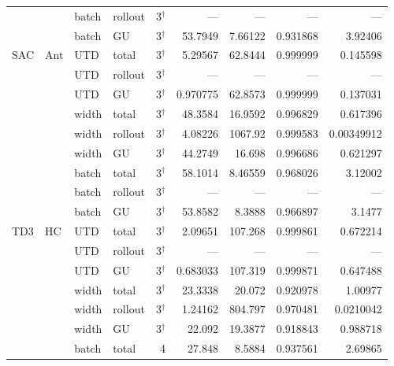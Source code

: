 {\begin{longtable}{@{}llllrrrrr@{}}
     &  & batch & rollout & \num{3}$^{\dagger}$ & --- & --- & --- & --- \\
     &  & batch & GU & \num{3}$^{\dagger}$ & \num{53.7949} & \num{7.66122} & \num{0.931868} & \num{3.92406} \\
    SAC & Ant & UTD & total & \num{3}$^{\dagger}$ & \num{5.29567} & \num{62.8444} & \num{0.999999} & \num{0.145598} \\
     &  & UTD & rollout & \num{3}$^{\dagger}$ & --- & --- & --- & --- \\
     &  & UTD & GU & \num{3}$^{\dagger}$ & \num{0.970775} & \num{62.8573} & \num{0.999999} & \num{0.137031} \\
     &  & width & total & \num{3}$^{\dagger}$ & \num{48.3584} & \num{16.9592} & \num{0.996829} & \num{0.617396} \\
     &  & width & rollout & \num{3}$^{\dagger}$ & \num{4.08226} & \num{1067.92} & \num{0.999583} & \num{0.00349912} \\
     &  & width & GU & \num{3}$^{\dagger}$ & \num{44.2749} & \num{16.698} & \num{0.996686} & \num{0.621297} \\
     &  & batch & total & \num{3}$^{\dagger}$ & \num{58.1014} & \num{8.46559} & \num{0.968026} & \num{3.12002} \\
     &  & batch & rollout & \num{3}$^{\dagger}$ & --- & --- & --- & --- \\
     &  & batch & GU & \num{3}$^{\dagger}$ & \num{53.8582} & \num{8.3888} & \num{0.966897} & \num{3.1477} \\
    \midrule
    TD3 & HC & UTD & total & \num{3}$^{\dagger}$ & \num{2.09651} & \num{107.268} & \num{0.999861} & \num{0.672214} \\
     &  & UTD & rollout & \num{3}$^{\dagger}$ & --- & --- & --- & --- \\
     &  & UTD & GU & \num{3}$^{\dagger}$ & \num{0.683033} & \num{107.319} & \num{0.999871} & \num{0.647488} \\
     &  & width & total & \num{3}$^{\dagger}$ & \num{23.3338} & \num{20.072} & \num{0.920978} & \num{1.00977} \\
     &  & width & rollout & \num{3}$^{\dagger}$ & \num{1.24162} & \num{804.797} & \num{0.970481} & \num{0.0210042} \\
     &  & width & GU & \num{3}$^{\dagger}$ & \num{22.092} & \num{19.3877} & \num{0.918843} & \num{0.988718} \\
     &  & batch & total & \num{4} & \num{27.848} & \num{8.5884} & \num{0.937561} & \num{2.69865} \\

\end{longtable}}
